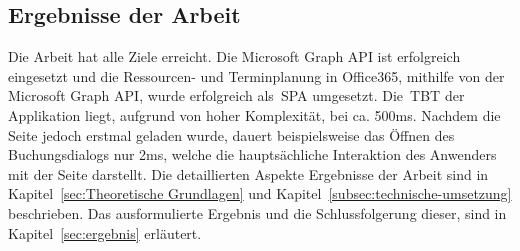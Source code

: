     \subsection{Ergebnisse der Arbeit}\label{subsec:ergebnisse-der-arbeit}
Die Arbeit hat alle Ziele erreicht.
    Die Microsoft Graph API ist erfolgreich eingesetzt und die Ressourcen- und Terminplanung in Office365, mithilfe von der Microsoft Graph API, wurde erfolgreich als~\gls{SPA} umgesetzt.
Die~\gls{TBT} der Applikation liegt, aufgrund von hoher Komplexität, bei ca. 500ms.
    Nachdem die Seite jedoch erstmal geladen wurde, dauert beispielsweise das Öffnen des Buchungsdialogs nur 2ms, welche die hauptsächliche Interaktion des Anwenders mit der Seite darstellt.
    \newline
Die detaillierten Aspekte Ergebnisse der Arbeit sind in Kapitel~\ref{sec:Theoretische Grundlagen} und Kapitel~\ref{subsec:technische-umsetzung} beschrieben.
Das ausformulierte Ergebnis und die Schlussfolgerung dieser, sind in Kapitel~\ref{sec:ergebnis} erläutert.
\newpage

